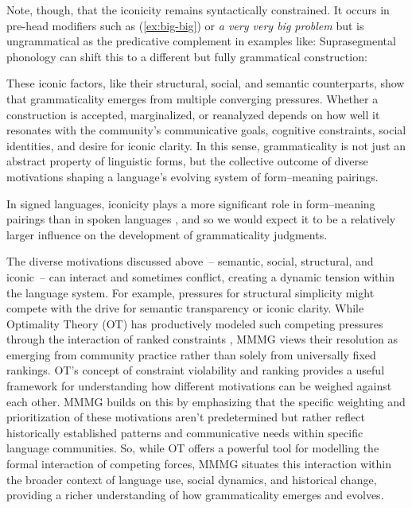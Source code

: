 Note, though, that the iconicity remains syntactically constrained. It occurs in pre-head modifiers such as (\ref{ex:big-big}) or \textit{a very very big problem} \autocite{Watt1968, Fries1970} but is ungrammatical as the predicative complement \autocite[561--562]{Huddleston2002} in examples like:
\label{ex:big-big2}
\z
Suprasegmental phonology can shift this to a different but fully grammatical construction:
\label{ex:big-big3}
\z

These iconic factors, like their structural, social, and semantic counterparts, show that grammaticality emerges from multiple converging pressures. Whether a construction is accepted, marginalized, or reanalyzed depends on how well it resonates with the community’s communicative goals, cognitive constraints, social identities, and desire for iconic clarity. In this sense, grammaticality is not just an abstract property of linguistic forms, but the collective outcome of diverse motivations shaping a language’s evolving system of form--meaning pairings.

In signed languages, iconicity plays a more significant role in form--meaning pairings than in spoken languages \autocite{Frishberg1975,Quer2019}, and so we would expect it to be a relatively larger influence on the development of grammaticality judgments.

\bigskip

The diverse motivations discussed above~-- semantic, social, structural, and iconic~-- can interact and sometimes conflict, creating a dynamic tension within the language system. For example, pressures for structural simplicity might compete with the drive for semantic transparency or iconic clarity. While Optimality Theory (OT) has productively modeled such competing pressures through the interaction of ranked constraints \autocite{prince2004}, MMMG views their resolution as emerging from community practice rather than solely from universally fixed rankings. OT's concept of constraint violability and ranking provides a useful framework for understanding how different motivations can be weighed against each other. MMMG builds on this by emphasizing that the specific weighting and prioritization of these motivations aren't predetermined but rather reflect historically established patterns and communicative needs within specific language communities. So, while OT offers a powerful tool for modelling the formal interaction of competing forces, MMMG situates this interaction within the broader context of language use, social dynamics, and historical change, providing a richer understanding of how grammaticality emerges and evolves.


